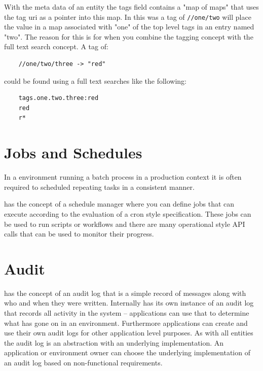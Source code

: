 With the meta data of an entity the tags field contains a "map of maps" that uses the tag uri as a pointer into this map. In this
was a tag of \verb+//one/two+ will place the value in a map associated with "one" of the top level tags in an entry named "two". The
reason for this is for when you combine the tagging concept with the full text search concept. A tag of:

\begin{Verbatim}
	//one/two/three -> "red"
\end{Verbatim}

could be found using a full text searches like the following:

\begin{Verbatim}
	tags.one.two.three:red
	red
	r*
\end{Verbatim}


\section{Jobs and Schedules}

In a \Rapture environment running a batch process in a production context it is often required to scheduled repeating tasks in a consistent manner.

\Rapture has the concept of a schedule manager where you can define jobs that can execute according to the evaluation of a cron style specification. These jobs
can be used to run scripts or workflows and there are many operational style API calls that can be used to monitor their progress.

\section{Audit}

\Rapture has the concept of an audit log that is a simple record of messages along with who and when they were written. Internally \Rapture has its own instance of
an audit log that records all activity in the system -- applications can use that to determine what has gone on in an environment. Furthermore applications can create
and use their own audit logs for other application level purposes. As with all \Rapture entities the audit log is an abstraction with an underlying implementation. An application
or environment owner can choose the underlying implementation of an audit log based on non-functional requirements.
